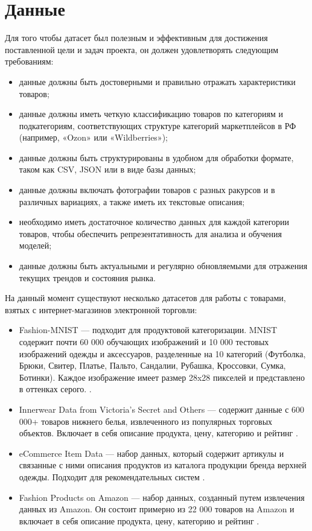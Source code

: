 \documentclass[a4paper,12pt]{extarticle}
\begin{document}
\newpage
\section{Данные} 

Для того чтобы датасет был полезным и эффективным для достижения поставленной цели и задач проекта, он должен удовлетворять следующим требованиям:
\begin{itemize}
	\item данные должны быть достоверными и правильно отражать характеристики товаров;
	\item данные должны иметь четкую классификацию товаров по категориям и подкатегориям, соответствующих структуре категорий маркетплейсов в РФ (например, «Ozon» или «Wildberries»);
	\item данные должны быть структурированы в удобном для обработки формате, таком как CSV, JSON или в виде базы данных;
	\item данные должны включать фотографии товаров с разных ракурсов и в различных вариациях, а также иметь их текстовые описания;
	\item необходимо иметь достаточное количество данных для каждой категории товаров, чтобы обеспечить репрезентативность для анализа и обучения моделей;
	\item данные должны быть актуальными и регулярно обновляемыми для отражения текущих трендов и состояния рынка.
\end{itemize}

На данный момент существуют несколько датасетов для работы с товарами, взятых с интернет-магазинов электронной торговли:
\begin{itemize}
	\item Fashion-MNIST — подходит для продуктовой категоризации. MNIST содержит почти 60 000 обучающих изображений и 10 000 тестовых изображений одежды и аксессуаров, разделенные на 10 категорий (Футболка, Брюки, Свитер, Платье, Пальто, Сандалии, Рубашка, Кроссовки, Сумка, Ботинки). Каждое изображение имеет размер 28x28 пикселей и представлено в оттенках серого. \cite{fashion_mnist}.
	\item Innerwear Data from Victoria's Secret and Others — содержит данные с 600 000+ товаров нижнего белья, извлеченного из популярных торговых объектов. Включает в себя описание продукта, цену, категорию и рейтинг \cite{victoria_secret_data}.
	\item eCommerce Item Data — набор данных, который содержит артикулы и связанные с ними описания продуктов из каталога продукции бренда верхней одежды. Подходит для рекомендательных систем \cite{eсommerce_item_data}.
	\item Fashion Products on Amazon — набор данных, созданный путем извлечения данных из Amazon. Он состоит примерно из 22 000 товаров на Amazon и включает в себя описание продукта, цену, категорию и рейтинг \cite{amazon_data}.
\end{itemize}
\end{document}
